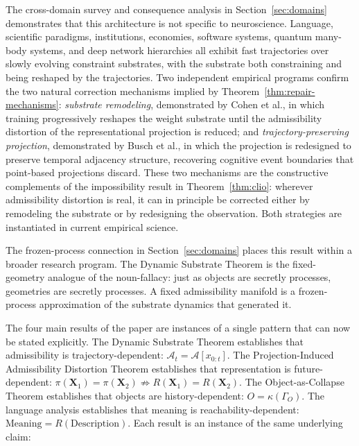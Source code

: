\documentclass[12pt,a4paper]{article}
\begin{document}
The cross-domain survey and consequence analysis in Section~\ref{sec:domains} demonstrates that this architecture is not specific to neuroscience. Language, scientific paradigms, institutions, economies, software systems, quantum many-body systems, and deep network hierarchies all exhibit fast trajectories over slowly evolving constraint substrates, with the substrate both constraining and being reshaped by the trajectories. Two independent empirical programs confirm the two natural correction mechanisms implied by Theorem~\ref{thm:repair-mechanisms}: \emph{substrate remodeling}, demonstrated by Cohen et al., in which training progressively reshapes the weight substrate until the admissibility distortion of the representational projection is reduced; and \emph{trajectory-preserving projection}, demonstrated by Busch et al., in which the projection is redesigned to preserve temporal adjacency structure, recovering cognitive event boundaries that point-based projections discard. These two mechanisms are the constructive complements of the impossibility result in Theorem~\ref{thm:clio}: wherever admissibility distortion is real, it can in principle be corrected either by remodeling the substrate or by redesigning the observation. Both strategies are instantiated in current empirical science.

The frozen-process connection in Section~\ref{sec:domains} places this result within a broader research program. The Dynamic Substrate Theorem is the fixed-geometry analogue of the noun-fallacy: just as objects are secretly processes, geometries are secretly processes. A fixed admissibility manifold is a frozen-process approximation of the substrate dynamics that generated it.

The four main results of the paper are instances of a single pattern that can now be stated explicitly. The Dynamic Substrate Theorem establishes that admissibility is trajectory-dependent: $\mathcal{A}_t = \mathcal{A}[x_{0:t}]$. The Projection-Induced Admissibility Distortion Theorem establishes that representation is future-dependent: $\pi(\mathbf{X}_1) = \pi(\mathbf{X}_2) \not\Rightarrow R(\mathbf{X}_1) = R(\mathbf{X}_2)$. The Object-as-Collapse Theorem establishes that objects are history-dependent: $O = \kappa(\Gamma_O)$. The language analysis establishes that meaning is reachability-dependent: $\text{Meaning} = R(\text{Description})$. Each result is an instance of the same underlying claim:

\begin{center}
\end{center}
\end{document}
